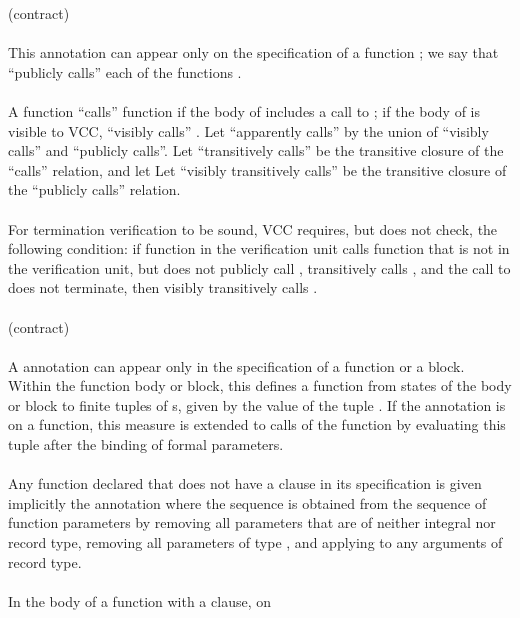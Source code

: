 \documentclass[preprint,nocopyrightspace]{sigplanconf}
\begin{document}
{{{ (contract)\\
\\ 
This annotation can appear only on the specification of a
function ; we say that  ``publicly calls'' each of the
functions . 
\\\\
A function  ``calls'' function  if the body of 
includes a call to ; if the body of  is visible to VCC,
 ``visibly calls'' . Let ``apparently calls'' by the
union of ``visibly calls'' and ``publicly calls''. 
Let ``transitively calls'' be the
transitive closure of the ``calls'' relation, and let Let ``visibly
transitively calls'' be the transitive closure of the ``publicly
calls'' relation. 
\\\\
For termination verification to be sound, VCC requires, but does not
check, the following condition: if function  in the
verification unit calls function  that is not in the
verification unit, but does not publicly call , 
transitively calls , and the call to  does not
terminate, then  visibly transitively calls .
\\\\
 (contract)\\
\\
A  annotation can appear only in the specification of a function or
a block. Within the
function body or block, this defines a function from states of the
body or block to finite tuples of \vcc{\natural}s, given by the value
of the tuple . If the annotation is on a function,
this measure is extended to calls of the function by evaluating this
tuple after the binding of formal parameters. 
\\\\
Any function declared  that does not have
a  clause in its specification is given implicitly
the annotation  where the
sequence  is obtained from the sequence of function
parameters by removing all parameters that are of neither 
integral nor record type, removing all parameters of type \vcc{\bool},
and applying  to any arguments of record type.
\\\\
In the body of a function  with a  clause, on
}}}
\end{document}
